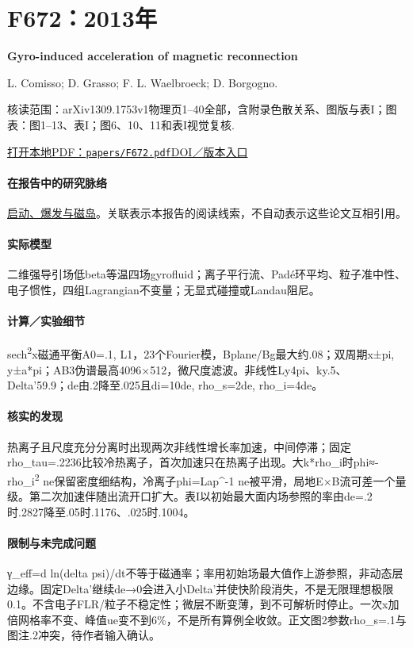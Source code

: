 \section{F672：2013年}\label{paper:F672}

\textbf{Gyro-induced acceleration of magnetic reconnection}\citep{F672}\

L. Comisso;  D. Grasso;  F. L. Waelbroeck;  D. Borgogno.

\textsf{核读范围：}arXiv1309.1753v1物理页1–40全部，含附录色散关系、图版与表I；\textsf{图表：}图1–13、表I；图6、10、11和表I视觉复核.

\href{run:papers/F672.pdf}{打开本地PDF：\texttt{papers/F672.pdf}}\quad\href{https://doi.org/10.1063/1.4821840}{DOI／版本入口}

\paragraph{在报告中的研究脉络}\hyperref[story:onset]{启动、爆发与磁岛}。关联表示本报告的阅读线索，不自动表示这些论文互相引用。

\paragraph{实际模型}二维强导引场低beta等温四场gyrofluid；离子平行流、Padé环平均、粒子准中性、电子惯性，四组Lagrangian不变量；无显式碰撞或Landau阻尼。

\paragraph{计算／实验细节}sech\textsuperscript{2}x磁通平衡A0=.1, L1，23个Fourier模，Bplane/Bg最大约.08；双周期x±pi, y±a*pi；AB3伪谱最高4096×512，微尺度滤波。非线性Ly4pi、ky.5、Delta'59.9；de由.2降至.025且di=10de, rho\_s=2de, rho\_i=4de。

\paragraph{核实的发现}热离子且尺度充分分离时出现两次非线性增长率加速，中间停滞；固定rho\_tau=.2236比较冷热离子，首次加速只在热离子出现。大k*rho\_i时phi≈-rho\_i\textsuperscript{2} ne保留密度细结构，冷离子phi=Lap\textasciicircum{}-1 ne被平滑，局地E×B流可差一个量级。第二次加速伴随出流开口扩大。表I以初始最大面内场参照的率由de=.2时.2827降至.05时.1176、.025时.1004。

\paragraph{限制与未完成问题}γ\_eff=d ln(delta psi)/dt不等于磁通率；率用初始场最大值作上游参照，非动态层边缘。固定Delta'继续de→0会进入小Delta'并使快阶段消失，不是无限理想极限0.1。不含电子FLR/粒子不稳定性；微层不断变薄，到不可解析时停止。一次x加倍网格率不变、峰值ue变不到6\%，不是所有算例全收敛。正文图2参数rho\_s=.1与图注.2冲突，待作者输入确认。

